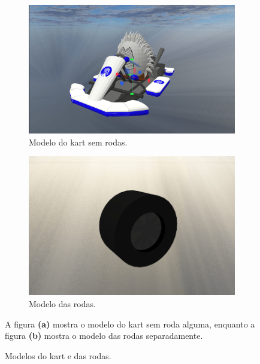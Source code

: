 \begin{figure}
    \centering
    \begin{subfigure}[t]{0.45\textwidth}
        \centering
        \includegraphics[width=1\textwidth]{figuras/Fluffy.png}
        \caption{Modelo do kart sem rodas.}
        \label{fig:kart}
    \end{subfigure}
    \hfill
    \begin{subfigure}[t]{0.45\textwidth}
        \centering
        \includegraphics[width=1\textwidth]{figuras/Modelo da roda.png}
        \caption{Modelo das rodas.}
        \label{fig:rodas}
    \end{subfigure}
    \caption{Modelos do kart e das rodas.}
    \footnotesize{A figura \textbf{(a)} mostra o modelo do kart sem roda alguma, enquanto a figura \textbf{(b)} mostra o modelo das rodas separadamente.}
    \label{fig:kart-rodas}
\end{figure}

